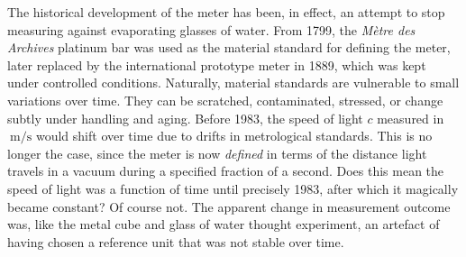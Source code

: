 \documentclass[12pt]{article}
\numberwithin{equation}{section}
\begin{document}
The historical development of the meter has been, in effect, an attempt to stop measuring against evaporating glasses of water. From 1799, the \emph{M\`etre des Archives} platinum bar was used as the material standard for defining the meter, later replaced by the international prototype meter in 1889, which was kept under controlled conditions. \citep[For a concise timeline, see][Appendix 4.]{BIPM2019} Naturally, material standards are vulnerable to small variations over time. They can be scratched, contaminated, stressed, or change subtly under handling and aging. Before 1983, the speed of light $c$ measured in $\SI{}{\meter\slash\second}$ would shift over time due to drifts in metrological standards. This is no longer the case, since the meter is now \emph{defined} in terms of the distance light travels in a vacuum during a specified fraction of a second. Does this mean the speed of light was a function of time until precisely 1983, after which it magically became constant? Of course not. The apparent change in measurement outcome was, like the metal cube and glass of water thought experiment, an artefact of having chosen a reference unit that was not stable over time. 
\end{document}
